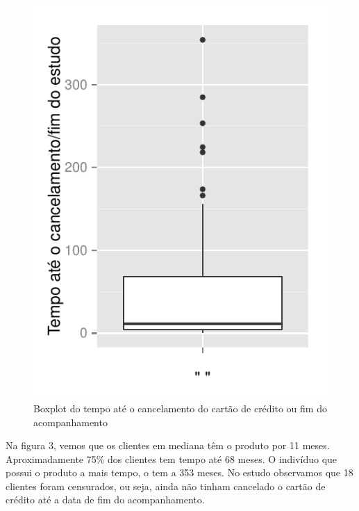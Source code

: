 \documentclass{article}\usepackage[]{graphicx}\usepackage[]{color}
\makeatletter
\def\maxwidth{ %
  \ifdim\Gin@nat@width>\linewidth
    \linewidth
  \else
    \Gin@nat@width
  \fi
}
\newenvironment{knitrout}{}{} %
\makeatother
\begin{document}
\begin{figure}[t!]

\centering
\begin{knitrout}
\color{fgcolor}
\includegraphics[width=\maxwidth]{figure/unnamed-chunk-4} 

\end{knitrout}
\caption{Boxplot do tempo até o cancelamento do cartão de crédito ou fim do acompanhamento}
\end{figure}

Na figura 3, vemos que os clientes em mediana têm o produto por 11 meses. Aproximadamente 75\% dos clientes tem tempo até 68 meses. O indivíduo que possui o produto a mais tempo, o tem a 353 meses. No estudo observamos que 18 clientes foram censurados, ou seja, ainda não tinham cancelado o cartão de crédito até a data de fim do acompanhamento.
\end{document}
